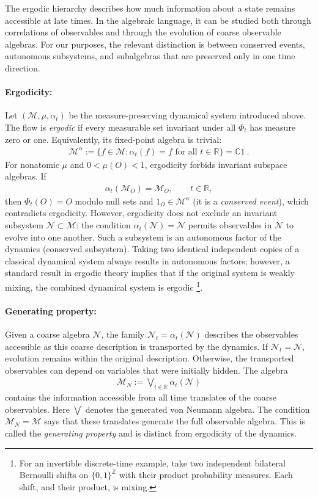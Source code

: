 \documentclass[a4paper,11pt]{article}
\theoremstyle{definition}
\begin{document}
The ergodic hierarchy describes how much information about a state remains accessible at late times. In the algebraic language, it can be studied both through correlations of observables and through the evolution of coarse observable algebras. For our purposes, the relevant distinction is between conserved events, autonomous subsystems, and subalgebras that are preserved only in one time direction.

\paragraph{Ergodicity:}
Let $(\mathcal M,\mu,\alpha_t)$ be the measure-preserving dynamical system introduced above. The flow is {\it ergodic} if every measurable set invariant under all $\Phi_t$ has measure zero or one. Equivalently, its fixed-point algebra is trivial:
\begin{align}
    \mathcal M^\alpha
    :=\{f\in\mathcal M:\alpha_t(f)=f\text{ for all }t\in\mathbb R\}
    =\mathbb C1\ .
\end{align}
For nonatomic $\mu$ and $0<\mu(O)<1$, ergodicity forbids invariant subspace algebras. If 
\begin{align}
    \alpha_t(\mathcal M_O)=\mathcal M_O,\qquad t\in\mathbb R,
\end{align}
then $\Phi_t(O)=O$ modulo null sets and $1_O\in\mathcal M^\alpha$ (it is a {\it conserved event}), which contradicts ergodicity. However, ergodicity does not exclude an invariant subsystem $\mathcal N\subset\mathcal M$: the condition $\alpha_t(\mathcal N)=\mathcal N$ permits observables in $\mathcal N$ to evolve into one another. Such a subsystem is an autonomous factor of the dynamics (conserved subsystem). Taking two identical independent copies of a classical dynamical system always results in autonomous factors; however, a standard result in ergodic theory implies that if the original system is weakly mixing, the combined dynamical system is ergodic \footnote{For an invertible discrete-time example, take two independent bilateral Bernoulli shifts on $\{0,1\}^{\mathbb Z}$ with their product probability measures. Each shift, and their product, is mixing.}.

\paragraph{Generating property:}
Given a coarse algebra $\mathcal N$, the family $\mathcal N_t=\alpha_t(\mathcal N)$ describes the observables accessible as this coarse description is transported by the dynamics. If $\mathcal N_t=\mathcal N$, evolution remains within the original description. Otherwise, the transported observables can depend on variables that were initially hidden. The algebra
\begin{align}
    \mathcal M_N:=\bigvee_{t\in\mathbb R}\alpha_t(\mathcal N)
\end{align}
contains the information accessible from all time translates of the coarse observables. Here $\bigvee$ denotes the generated von Neumann algebra. The condition $\mathcal M_N=\mathcal M$ says that these translates generate the full observable algebra. This is called the {\it generating property} and is distinct from ergodicity of the dynamics.
\end{document}
